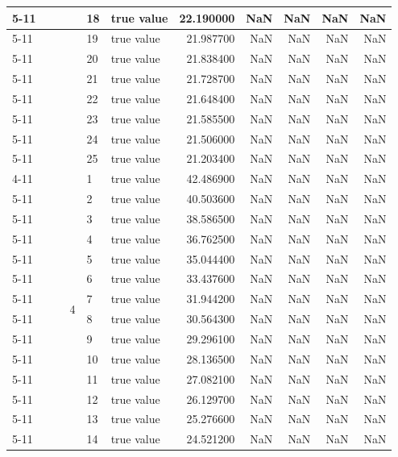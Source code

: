 \begin{tabular}{llllllrrrrr}
\cline{5-11}
 &  &  &  & 18 & true value & 22.190000 & NaN & NaN & NaN & NaN \\
\cline{5-11}
 &  &  &  & 19 & true value & 21.987700 & NaN & NaN & NaN & NaN \\
\cline{5-11}
 &  &  &  & 20 & true value & 21.838400 & NaN & NaN & NaN & NaN \\
\cline{5-11}
 &  &  &  & 21 & true value & 21.728700 & NaN & NaN & NaN & NaN \\
\cline{5-11}
 &  &  &  & 22 & true value & 21.648400 & NaN & NaN & NaN & NaN \\
\cline{5-11}
 &  &  &  & 23 & true value & 21.585500 & NaN & NaN & NaN & NaN \\
\cline{5-11}
 &  &  &  & 24 & true value & 21.506000 & NaN & NaN & NaN & NaN \\
\cline{5-11}
 &  &  &  & 25 & true value & 21.203400 & NaN & NaN & NaN & NaN \\
\cline{4-11} \cline{5-11}
 &  &  & \multirow[t]{25}{*}{4} & 1 & true value & 42.486900 & NaN & NaN & NaN & NaN \\
\cline{5-11}
 &  &  &  & 2 & true value & 40.503600 & NaN & NaN & NaN & NaN \\
\cline{5-11}
 &  &  &  & 3 & true value & 38.586500 & NaN & NaN & NaN & NaN \\
\cline{5-11}
 &  &  &  & 4 & true value & 36.762500 & NaN & NaN & NaN & NaN \\
\cline{5-11}
 &  &  &  & 5 & true value & 35.044400 & NaN & NaN & NaN & NaN \\
\cline{5-11}
 &  &  &  & 6 & true value & 33.437600 & NaN & NaN & NaN & NaN \\
\cline{5-11}
 &  &  &  & 7 & true value & 31.944200 & NaN & NaN & NaN & NaN \\
\cline{5-11}
 &  &  &  & 8 & true value & 30.564300 & NaN & NaN & NaN & NaN \\
\cline{5-11}
 &  &  &  & 9 & true value & 29.296100 & NaN & NaN & NaN & NaN \\
\cline{5-11}
 &  &  &  & 10 & true value & 28.136500 & NaN & NaN & NaN & NaN \\
\cline{5-11}
 &  &  &  & 11 & true value & 27.082100 & NaN & NaN & NaN & NaN \\
\cline{5-11}
 &  &  &  & 12 & true value & 26.129700 & NaN & NaN & NaN & NaN \\
\cline{5-11}
 &  &  &  & 13 & true value & 25.276600 & NaN & NaN & NaN & NaN \\
\cline{5-11}
 &  &  &  & 14 & true value & 24.521200 & NaN & NaN & NaN & NaN \\

\end{tabular}
